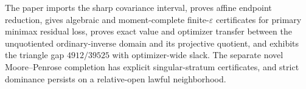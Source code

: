 The paper imports the sharp covariance interval, proves affine endpoint reduction, gives algebraic and moment-complete finite-\(\varepsilon\) certificates for primary minimax residual loss, proves exact value and optimizer transfer between the unquotiented ordinary-inverse domain and its projective quotient, and exhibits the triangle gap \(4912/39525\) with optimizer-wide slack.  The separate novel Moore--Penrose completion has explicit singular-stratum certificates, and strict dominance persists on a relative-open lawful neighborhood.